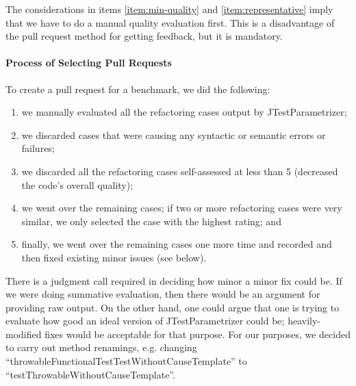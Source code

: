The considerations in items \ref{item:min-quality} and \ref{item:representative} imply that we have to do a manual quality evaluation first. This is a disadvantage of the pull request method for getting feedback, but it is mandatory.


\paragraph{Process of Selecting Pull Requests} \label{section:selection-process}

To create a pull request for a benchmark, we did the following:

 \begin{enumerate}

  \item \label{item:selecting-pr-step-one} we manually evaluated all the refactoring cases output by JTestParametrizer;

  \item \label{item:selecting-pr-step-two} we discarded cases that were causing any syntactic or semantic errors or failures;

  \item \label{item:selecting-pr-step-three} we discarded all the refactoring cases self-assessed at less than 5 (decreased the code's overall quality);
  
  \item \label{item:selecting-representative} we went over the remaining cases; if two or more refactoring cases were very similar, we only selected the case with the highest rating; and
  
  \item \label{item:minor-changes} finally, we went over the remaining cases one more time and recorded and then fixed existing minor issues (see below). 
\end{enumerate}

There is a judgment call required in deciding how minor a minor fix could be. If we were doing summative evaluation, then there would be an argument for providing raw output. On the other hand, one could argue that one is trying to evaluate how good an ideal version of JTestParametrizer could be; heavily-modified fixes would be acceptable for that purpose. For our purposes, we decided to carry out method renamings, e.g. changing ``throwableFunctionalTestTestWithoutCauseTemplate'' to ``testThrowableWithoutCauseTemplate''.



